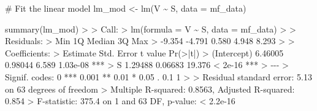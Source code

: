 \documentclass[
  letterpaper,
]{book}
\newenvironment{Shaded}{\begin{snugshade}}{\end{snugshade}}
\newcommand{\AttributeTok}[1]{\textcolor[rgb]{0.40,0.45,0.13}{#1}}
\newcommand{\CommentTok}[1]{\textcolor[rgb]{0.37,0.37,0.37}{#1}}
\newcommand{\DecValTok}[1]{\textcolor[rgb]{0.68,0.00,0.00}{#1}}
\newcommand{\ErrorTok}[1]{\textcolor[rgb]{0.68,0.00,0.00}{#1}}
\newcommand{\FloatTok}[1]{\textcolor[rgb]{0.68,0.00,0.00}{#1}}
\newcommand{\FunctionTok}[1]{\textcolor[rgb]{0.28,0.35,0.67}{#1}}
\newcommand{\NormalTok}[1]{\textcolor[rgb]{0.00,0.23,0.31}{#1}}
\newcommand{\OtherTok}[1]{\textcolor[rgb]{0.00,0.23,0.31}{#1}}
\newcommand{\SpecialCharTok}[1]{\textcolor[rgb]{0.37,0.37,0.37}{#1}}
\newcommand{\StringTok}[1]{\textcolor[rgb]{0.13,0.47,0.30}{#1}}
\begin{document}
\begin{Shaded}
\begin{Highlighting}[]
\CommentTok{\# Fit the linear model}
\NormalTok{lm\_mod }\OtherTok{\textless{}{-}} \FunctionTok{lm}\NormalTok{(V }\SpecialCharTok{\textasciitilde{}}\NormalTok{ S, }\AttributeTok{data =}\NormalTok{ mf\_data)}

\FunctionTok{summary}\NormalTok{(lm\_mod)}
\SpecialCharTok{\textgreater{}} 
\ErrorTok{\textgreater{}}\NormalTok{ Call}\SpecialCharTok{:}
\ErrorTok{\textgreater{}} \FunctionTok{lm}\NormalTok{(}\AttributeTok{formula =}\NormalTok{ V }\SpecialCharTok{\textasciitilde{}}\NormalTok{ S, }\AttributeTok{data =}\NormalTok{ mf\_data)}
\SpecialCharTok{\textgreater{}} 
\ErrorTok{\textgreater{}}\NormalTok{ Residuals}\SpecialCharTok{:}
\ErrorTok{\textgreater{}}\NormalTok{    Min     }\DecValTok{1}\NormalTok{Q Median     }\DecValTok{3}\NormalTok{Q    Max }
\SpecialCharTok{\textgreater{}} \SpecialCharTok{{-}}\FloatTok{9.354} \SpecialCharTok{{-}}\FloatTok{4.791}  \FloatTok{0.580}  \FloatTok{4.948}  \FloatTok{8.293} 
\SpecialCharTok{\textgreater{}} 
\ErrorTok{\textgreater{}}\NormalTok{ Coefficients}\SpecialCharTok{:}
\ErrorTok{\textgreater{}}\NormalTok{             Estimate Std. Error t value }\FunctionTok{Pr}\NormalTok{(}\SpecialCharTok{\textgreater{}}\ErrorTok{|}\NormalTok{t}\SpecialCharTok{|}\NormalTok{)    }
\SpecialCharTok{\textgreater{}}\NormalTok{ (Intercept)  }\FloatTok{6.46005}    \FloatTok{0.98044}   \FloatTok{6.589} \FloatTok{1.03e{-}08} \SpecialCharTok{**}\ErrorTok{*}
\ErrorTok{\textgreater{}}\NormalTok{ S            }\FloatTok{1.29488}    \FloatTok{0.06683}  \FloatTok{19.376}  \SpecialCharTok{\textless{}} \FloatTok{2e{-}16} \SpecialCharTok{**}\ErrorTok{*}
\ErrorTok{\textgreater{}} \SpecialCharTok{{-}{-}{-}}
\ErrorTok{\textgreater{}}\NormalTok{ Signif. codes}\SpecialCharTok{:}  \DecValTok{0} \StringTok{\textquotesingle{}***\textquotesingle{}} \FloatTok{0.001} \StringTok{\textquotesingle{}**\textquotesingle{}} \FloatTok{0.01} \StringTok{\textquotesingle{}*\textquotesingle{}} \FloatTok{0.05} \StringTok{\textquotesingle{}.\textquotesingle{}} \FloatTok{0.1} \StringTok{\textquotesingle{} \textquotesingle{}} \DecValTok{1}
\SpecialCharTok{\textgreater{}} 
\ErrorTok{\textgreater{}}\NormalTok{ Residual standard error}\SpecialCharTok{:} \FloatTok{5.13}\NormalTok{ on }\DecValTok{63}\NormalTok{ degrees of freedom}
\SpecialCharTok{\textgreater{}}\NormalTok{ Multiple R}\SpecialCharTok{{-}}\NormalTok{squared}\SpecialCharTok{:}  \FloatTok{0.8563}\NormalTok{,  Adjusted R}\SpecialCharTok{{-}}\NormalTok{squared}\SpecialCharTok{:}  \FloatTok{0.854} 
\SpecialCharTok{\textgreater{}}\NormalTok{ F}\SpecialCharTok{{-}}\NormalTok{statistic}\SpecialCharTok{:} \FloatTok{375.4}\NormalTok{ on }\DecValTok{1}\NormalTok{ and }\DecValTok{63}\NormalTok{ DF,  p}\SpecialCharTok{{-}}\NormalTok{value}\SpecialCharTok{:} \ErrorTok{\textless{}} \FloatTok{2.2e{-}16}
\end{Highlighting}
\end{Shaded}
\end{document}

